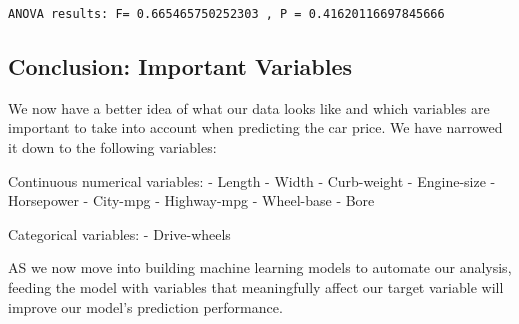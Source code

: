 \documentclass[11pt]{article}
\begin{document}
    \begin{Verbatim}[commandchars=\\\{\}]
ANOVA results: F= 0.665465750252303 , P = 0.41620116697845666

    \end{Verbatim}

    \subsection{Conclusion: Important
Variables}\label{conclusion-important-variables}

    We now have a better idea of what our data looks like and which
variables are important to take into account when predicting the car
price. We have narrowed it down to the following variables:

Continuous numerical variables: - Length - Width - Curb-weight -
Engine-size - Horsepower - City-mpg - Highway-mpg - Wheel-base - Bore

Categorical variables: - Drive-wheels

AS we now move into building machine learning models to automate our
analysis, feeding the model with variables that meaningfully affect our
target variable will improve our model's prediction performance.


    
    
    
    
\end{document}
